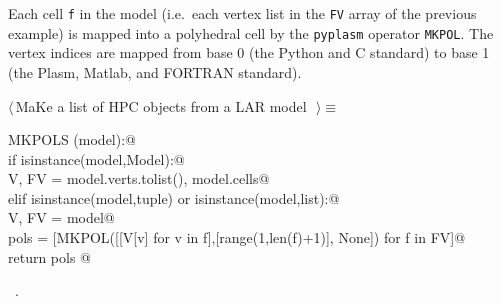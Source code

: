 \documentclass[11pt,oneside]{article}	%
\begin{document}
Each cell \texttt{f} in the model (i.e.~each vertex list in the \texttt{FV} array of the previous example) is mapped into a polyhedral cell by the \texttt{pyplasm} operator \texttt{MKPOL}. The vertex indices are mapped from base 0 (the Python and C standard) to base 1 (the Plasm, Matlab, and FORTRAN standard).
\begin{flushleft} \small
\begin{minipage}{\linewidth} \label{scrap8}
$\langle\,$MaKe a list of HPC objects from a LAR model\nobreak\ {\footnotesize {}}$\,\rangle\equiv$
\vspace{-1ex}
\begin{list}{}{} \item
\mbox{}\verb@def MKPOLS (model):@\\
\mbox{}\verb@    if isinstance(model,Model):@\\
\mbox{}\verb@        V, FV = model.verts.tolist(), model.cells@\\
\mbox{}\verb@    elif isinstance(model,tuple) or isinstance(model,list):@\\
\mbox{}\verb@        V, FV = model@\\
\mbox{}\verb@    pols = [MKPOL([[V[v] for v in f],[range(1,len(f)+1)], None]) for f in FV]@\\
\mbox{}\verb@    return pols  @\\
\mbox{}\verb@@{\NWsep}
\end{list}
\vspace{-1ex}
\footnotesize\addtolength{\baselineskip}{-1ex}
\begin{list}{}{\setlength{\itemsep}{-\parsep}\setlength{\itemindent}{-\leftmargin}}
\item \NWtxtMacroRefIn\ .
\end{list}
\end{minipage}\\[4ex]
\end{flushleft}
\end{document}

